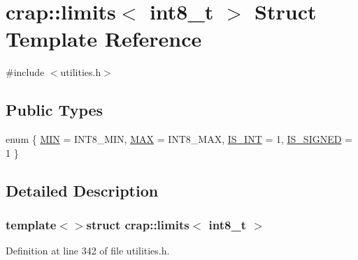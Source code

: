 \hypertarget{structcrap_1_1limits_3_01int8__t_01_4}{}\section{crap\+:\+:limits$<$ int8\+\_\+t $>$ Struct Template Reference}
\label{structcrap_1_1limits_3_01int8__t_01_4}


{\ttfamily \#include $<$utilities.\+h$>$}

\subsection*{Public Types}
\begin{DoxyCompactItemize}
\item 
enum \{ \hyperlink{structcrap_1_1limits_3_01int8__t_01_4_a05d8ad2658a42c30bf779f24ca89536ba6823d6bcb5d7b70e7f8322dd0c7fd7df}{M\+I\+N} = I\+N\+T8\+\_\+\+M\+I\+N, 
\hyperlink{structcrap_1_1limits_3_01int8__t_01_4_a05d8ad2658a42c30bf779f24ca89536ba9543c5a48d5992dc82e76d69429da979}{M\+A\+X} = I\+N\+T8\+\_\+\+M\+A\+X, 
\hyperlink{structcrap_1_1limits_3_01int8__t_01_4_a05d8ad2658a42c30bf779f24ca89536bacbd9edde5039c13a6d9b426a2a5572ce}{I\+S\+\_\+\+I\+N\+T} = 1, 
\hyperlink{structcrap_1_1limits_3_01int8__t_01_4_a05d8ad2658a42c30bf779f24ca89536ba258700f71fd08d84a95da134315f85c4}{I\+S\+\_\+\+S\+I\+G\+N\+E\+D} = 1
 \}
\end{DoxyCompactItemize}


\subsection{Detailed Description}
\subsubsection*{template$<$$>$struct crap\+::limits$<$ int8\+\_\+t $>$}



Definition at line 342 of file utilities.\+h.



